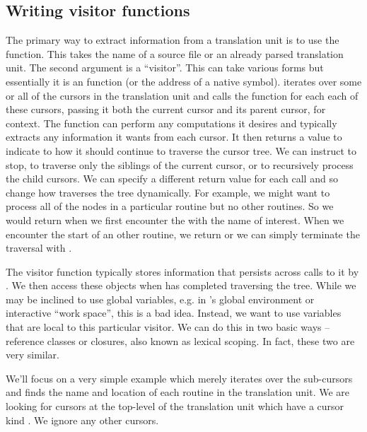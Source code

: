 \subsection{Writing visitor functions}


The primary way to extract information from a translation unit is to
use the  function.  This takes the name of a source
file or an already parsed translation unit.  The second argument is a
``visitor''.  This can take various forms but essentially it is an
\R{} function (or the address of a native symbol).  \libclang{}
iterates over some or all of the cursors in the translation unit and
calls the \R{} function for each each of these cursors, passing it
both the current cursor and its parent cursor, for context.  The
function can perform any computations it desires and typically
extracts any information it wants from each cursor. 
It then returns a
value to indicate to \libclang{} how it should continue to traverse
the cursor tree.  We can instruct \libclang{} to stop, to traverse
only the siblings of the current cursor, or to recursively process the
child cursors.  We can specify a different return value for each call
and so change how \libclang{} traverses the tree dynamically.  For
example, we might want to process all of the nodes in a particular
routine but no other routines. So we would return
 when we first encounter the %
with the name of interest.  When we encounter the start of an other routine, we return
 or we can simply terminate the traversal with
.

The visitor function typically stores information that persists across
calls to it by \libclang.  We then access these objects when
\libclang{} has completed traversing the tree.  While we may be
inclined to use global variables, e.g. in \R{}'s global environment or
interactive ``work space'', this is a bad idea.  Instead, we want to
use variables that are local to this particular visitor.  We can do
this in two basic ways -- reference classes or closures, also known as
lexical scoping.  In fact, these two are very similar.

We'll focus on a very simple example which merely
iterates over the sub-cursors and finds the name and location of each
routine in the translation unit.  We are looking for cursors at the
top-level of the translation unit which have a cursor kind
.  We ignore any other cursors.


